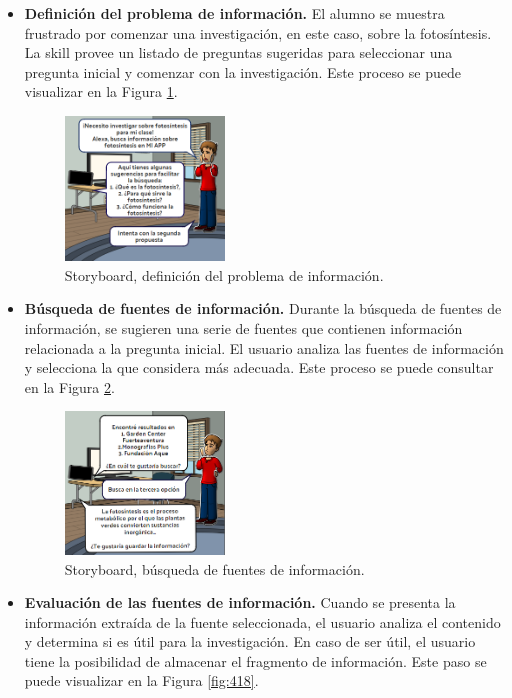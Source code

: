 \begin{itemize}
  \item \textbf{Definición del problema de información.} El alumno se muestra frustrado por comenzar una investigación, en este caso, sobre la fotosíntesis. La skill provee un listado de preguntas sugeridas para seleccionar una pregunta inicial y comenzar con la investigación. Este proceso se puede visualizar en la Figura \ref{fig:416}.
  \begin{figure}[H]
    \centering
    \includegraphics[width=0.40\textwidth]{Cap4/Figuras/01.png}
    \caption{Storyboard, definición del problema de información.}
    \label{fig:416}
  \end{figure}
  \item \textbf{Búsqueda de fuentes de información.} Durante la búsqueda de fuentes de información, se sugieren una serie de fuentes que contienen información relacionada a la pregunta inicial. El usuario analiza las fuentes de información y selecciona la que considera más adecuada. Este proceso se puede consultar en la Figura \ref{fig:417}.
  \begin{figure}[H]
    \centering
    \includegraphics[width=0.40\textwidth]{Cap4/Figuras/02.png}
    \caption{Storyboard, búsqueda de fuentes de información.}
    \label{fig:417}
  \end{figure}
  \item \textbf{Evaluación de las fuentes de información.} Cuando se presenta la información extraída de la fuente seleccionada, el usuario analiza el contenido y determina si es útil para la investigación. En caso de ser útil, el usuario tiene la posibilidad de almacenar el fragmento de información. Este paso se puede visualizar en la Figura \ref{fig:418}.

\end{itemize}
